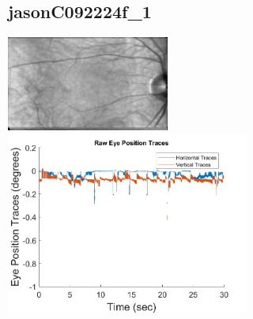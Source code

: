 \documentclass[11pt]{article}
\begin{document}
\subsection{jasonC092224f\_1}
\includegraphics[width=0.40\textwidth, valign=m]{referenceframes/rodenstock_normal/jasonC092224f_1_dwt_nostim_gamscaled_bandfilt_refframe.jpg}
\includegraphics[width=0.60\textwidth, valign=m]{eyepositiontraces/rodenstock_normal/jasonC092224f_1.jpg}\\
\end{document}
